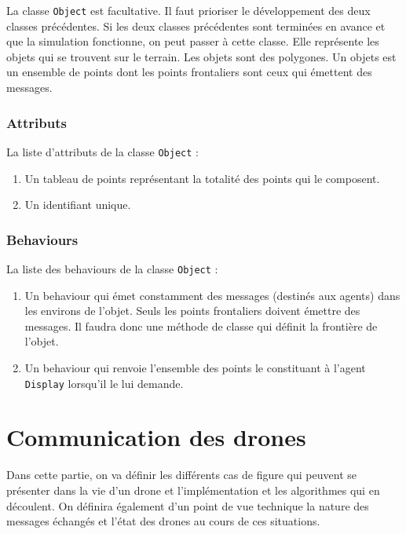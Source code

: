 \documentclass[11pt]{report}
\begin{document}
La classe \verb|Object| est facultative. Il faut prioriser le développement des deux classes précédentes. Si les deux classes précédentes sont terminées en avance et que la simulation fonctionne, on peut passer à cette classe. Elle représente les objets qui se trouvent sur le terrain. Les objets sont des polygones. Un objets est un ensemble de points dont les points frontaliers sont ceux qui émettent des messages.

\subsubsection{Attributs}

La liste d'attributs de la classe \verb|Object| :

\begin{enumerate}
\item Un tableau de points représentant la totalité des points qui le composent.

\item Un identifiant unique.
\end{enumerate}

\subsubsection{Behaviours}

La liste des behaviours de la classe \verb|Object| :

\begin{enumerate}
\item Un behaviour qui émet constamment des messages (destinés aux agents) dans les environs de l'objet. Seuls les points frontaliers doivent émettre des messages. Il faudra donc une méthode de classe qui définit la frontière de l'objet.

\item Un behaviour qui renvoie l'ensemble des points le constituant à l'agent \verb|Display| lorsqu'il le lui demande.
\end{enumerate}

\newpage
\section{\textbf{Communication des drones}}

Dans cette partie, on va définir les différents cas de figure qui peuvent se présenter dans la vie d'un drone et l'implémentation et les algorithmes qui en découlent. On définira également d'un point de vue technique la nature des messages échangés et l'état des drones au cours de ces situations.
\end{document}
